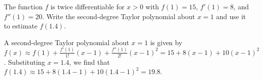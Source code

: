 \begin{Exercise} The function $f$ is twice 
differentiable for $x > 0$ with $f(1) = 15$, $f'(1) = 8$, and $f''(1) = 20$. 
Write the second-degree Taylor polynomial about $x = 1$ and use it to 
estimate $f(1.4)$.
\end{Exercise}

\begin{Answer}
A second-degree Taylor polynomial about $x = 1$ is given by $f(x) \approx f(1) 
+ \frac{f'(1)}{1!}(x - 1) + \frac{f''(1)}{2!}(x - 1)^2 = 15 + 8(x - 1) + 10(x 
- 1)^2$. Substituting $x = 1.4$, we find that $f(1.4) \approx 15 + 8(1.4 - 1) 
+ 10(1.4 - 1)^2 = 19.8$.
\end{Answer}


